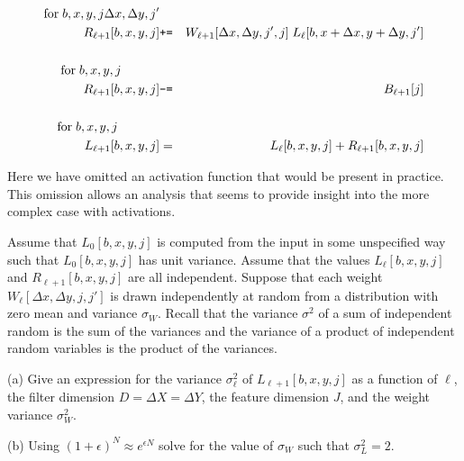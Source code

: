 \documentclass{article}
\begin{document}
\begin{eqnarray*}
  \mathrm{for}\;b,x,y,j\Delta x,\Delta y,j' \\
  \;\;\;  R_{\ell+1}[b,x,y,j] & \mbox{\tt +=} & W_{\ell+1}[\Delta x, \Delta y, j',j]\; L_{\ell}[b,x + \Delta x, y + \Delta y, j'] \\
  \\
  \mathrm{for}\;b,x,y,j \;\;\;\;\;\;\;\;\;\;\;\\
    \;\;\;  R_{\ell+1}[b,x,y,j] & \mbox{\tt -=} & B_{\ell+1}[j] \\
\\
\mathrm{for}\;b,x,y,j\;\;\;\;\;\;\;\;\;\;\;\;\\
L_{\ell+1}[b,x,y,j] & = & L_{\ell}[b,x,y,j] + R_{\ell+1}[b,x,y,j]
\end{eqnarray*}


Here we have omitted an activation function that would be present in practice.  This omission allows an analysis that seems to provide insight
into the more complex case with activations.

Assume that $L_0[b,x,y,j]$
is computed from the input in some unspecified way such that $L_0[b,x,y,j]$ has unit variance.
Assume that the values $L_\ell[b,x,y,j]$  and $R_{\ell+1}[b,x,y,j]$ are all independent.
Suppose that each weight $W_\ell[\Delta x,\Delta y,j,j']$ is drawn independently at random
from a distribution with zero mean and variance $\sigma_W$. Recall that the variance $\sigma^2$ of
a sum of independent random is the sum of the variances and the variance of a product of independent random variables is the product of the variances.

\medskip
(a) Give an expression for
the variance $\sigma^2_\ell$ of $L_{\ell+1}[b,x,y,j]$ as a function of $\ell$, the filter dimension $D = \Delta X = \Delta Y$,
the feature dimension $J$, and the weight variance $\sigma_W^2$.


\medskip
(b) Using $(1+\epsilon)^N \approx e^{\epsilon N}$ solve for the value of $\sigma_W$ such that $\sigma^2_L = 2$.
\end{document}
